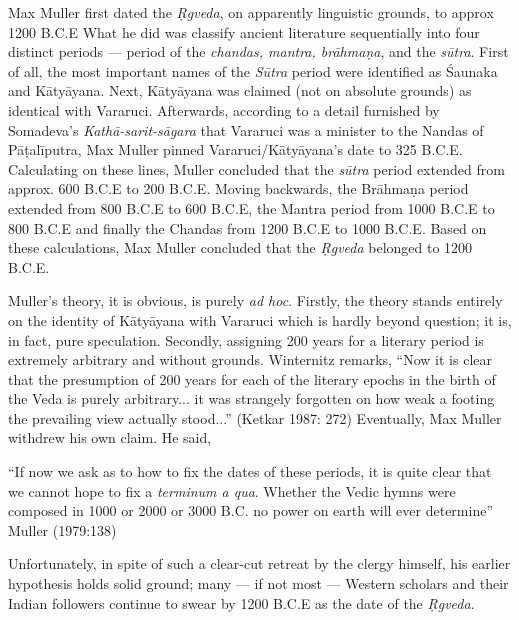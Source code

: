 Max Muller first dated the {\sl Ṛgveda}, on apparently linguistic grounds, to approx 1200 B.C.E What he did was classify ancient literature sequentially into four distinct periods --- period of the {\sl chandas, mantra, brāhmaṇa}, and the {\sl sūtra}. First of all, the most important names of the {\sl Sūtra} period were identified as Śaunaka and Kātyāyana. Next, Kātyāyana was claimed (not on absolute grounds) as identical with Vararuci. Afterwards, according to a detail furnished by Somadeva’s {\sl Kathā-sarit-sāgara} that Vararuci was a minister to the Nandas of Pāṭalīputra, Max Muller pinned Vararuci/Kātyāyana’s date to 325 B.C.E. Calculating on these lines, Muller concluded that the {\sl sūtra} period extended from approx. 600 B.C.E to 200 B.C.E. Moving backwards, the Brāhmaṇa period extended from 800 B.C.E to 600 B.C.E, the Mantra period from 1000 B.C.E to 800 B.C.E and finally the Chandas from 1200 B.C.E to 1000 B.C.E. Based on these calculations, Max Muller concluded that the {\sl Ṛgveda} belonged to 1200 B.C.E.  

Muller’s theory, it is obvious, is purely {\sl ad hoc}. Firstly, the theory stands entirely on the identity of Kātyāyana with Vararuci which is hardly beyond question; it is, in fact, pure speculation. Secondly, assigning 200 years for a literary period is extremely arbitrary and without grounds. Winternitz remarks, “Now it is clear that the presumption of 200 years for each of the literary epochs in the birth of the Veda is purely arbitrary... it was strangely forgotten on how weak a footing the prevailing view actually stood...” (Ketkar 1987: 272) Eventually, Max Muller withdrew his own claim. He said,

\begin{myquote}
“If now we ask as to how to fix the dates of these periods, it is quite clear that we cannot hope to fix a {\sl terminum a qua}. Whether the Vedic hymns were composed in 1000 or 2000 or 3000 B.C. no power on earth will ever determine”
\hfill Muller (1979:138)
\end{myquote}

\newpage

Unfortunately, in spite of such a clear-cut retreat by the clergy himself, his earlier hypothesis holds solid ground; many --- if not most --- Western scholars and their Indian followers continue to swear by 1200 B.C.E as the date of the {\sl Ṛgveda}. 

